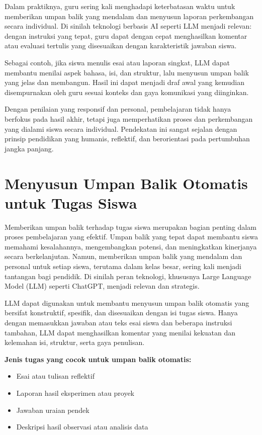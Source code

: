 Dalam praktiknya, guru sering kali menghadapi keterbatasan waktu untuk memberikan umpan balik yang mendalam dan menyusun laporan perkembangan secara individual. Di sinilah teknologi berbasis AI seperti LLM menjadi relevan: dengan instruksi yang tepat, guru dapat dengan cepat menghasilkan komentar atau evaluasi tertulis yang disesuaikan dengan karakteristik jawaban siswa.

Sebagai contoh, jika siswa menulis esai atau laporan singkat, LLM dapat membantu menilai aspek bahasa, isi, dan struktur, lalu menyusun umpan balik yang jelas dan membangun. Hasil ini dapat menjadi draf awal yang kemudian disempurnakan oleh guru sesuai konteks dan gaya komunikasi yang diinginkan.

Dengan penilaian yang responsif dan personal, pembelajaran tidak hanya berfokus pada hasil akhir, tetapi juga memperhatikan proses dan perkembangan yang dialami siswa secara individual. Pendekatan ini sangat sejalan dengan prinsip pendidikan yang humanis, reflektif, dan berorientasi pada pertumbuhan jangka panjang.


\section{Menyusun Umpan Balik Otomatis untuk Tugas Siswa}

Memberikan umpan balik terhadap tugas siswa merupakan bagian penting dalam proses pembelajaran yang efektif. Umpan balik yang tepat dapat membantu siswa memahami kesalahannya, mengembangkan potensi, dan meningkatkan kinerjanya secara berkelanjutan. Namun, memberikan umpan balik yang mendalam dan personal untuk setiap siswa, terutama dalam kelas besar, sering kali menjadi tantangan bagi pendidik. Di sinilah peran teknologi, khususnya Large Language Model (LLM) seperti ChatGPT, menjadi relevan dan strategis.

LLM dapat digunakan untuk membantu menyusun umpan balik otomatis yang bersifat konstruktif, spesifik, dan disesuaikan dengan isi tugas siswa. Hanya dengan memasukkan jawaban atau teks esai siswa dan beberapa instruksi tambahan, LLM dapat menghasilkan komentar yang menilai kekuatan dan kelemahan isi, struktur, serta gaya penulisan.

\textbf{Jenis tugas yang cocok untuk umpan balik otomatis:}
\begin{itemize}
	\item Esai atau tulisan reflektif
	\item Laporan hasil eksperimen atau proyek
	\item Jawaban uraian pendek
	\item Deskripsi hasil observasi atau analisis data
\end{itemize}

